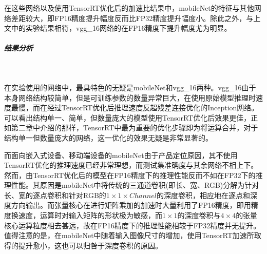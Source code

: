 \par 在这些网络以及使用TensorRT优化后的加速比结果中，mobileNet的特征与其他网络差距较大，即FP16精度提升幅度反而比FP32精度提升幅度小。除此之外，与上文中的实验结果相符，vgg\_16网络的在FP16精度下提升幅度尤为明显。
\subparagraph{结果分析}~{}
\par 在实验使用的网络中，最具特色的无疑是mobileNet和vgg\_16两种。vgg\_16由于本身网络结构较简单，但是可训练参数的数量异常巨大，在使用原始模型推理时速度最慢，而在经过TensorRT优化后推理速度反超残差连接优化的Inception网络。可以看出结构单一、简单，但数量庞大的模型使用TensorRT优化后效果更佳，正如第二章中介绍的那样，TensorRT中最为重要的优化步骤即为将运算合并，对于结构单一但数量庞大的网络，这一优化的效果无疑是非常显著的。
\par 而面向嵌入式设备、移动端设备的mobileNet由于产品定位原因，其不使用TensorRT优化的推理速度已经非常理想，而测试集准确度与其余网络不相上下。然而，由TensorRT优化后的模型在FP16精度下的推理性能反而不如在FP32下的推理性能。其原因是mobileNet中将传统的三通道卷积(即长、宽、RGB)分解为针对长、宽的逐点卷积和针对RGB的$ 1\times 1\times Channel $的深度卷积，相应地在逐点和深度方向输出。而张量核心在进行矩阵乘加的加速时大量利用了FP16精度，即用精度换速度，运算时对输入矩阵的形状极为敏感，而$ 1\times 1 $的深度卷积与$ 4 \times 4 $的张量核心运算粒度相去甚远，故在FP16精度下的推理性能相较于FP32精度并无提升。值得注意的是，在mobileNet中随着输入图像尺寸的增加，使用TensorRT加速所取得的提升愈小，这也可以归咎于深度卷积的原因。

